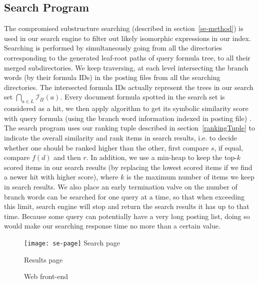 \subsection{Search Program}
\label{se-and-rank}
The compromised substructure searching (described in section~\ref{se-method}) is used in our search engine to filter out likely isomorphic expressions in our index.
Searching is performed by simultaneously going from all the directories corresponding to the generated leaf-root paths of query formula tree,
to all their merged subdirectories. 
We keep traversing, at each level intersecting the branch words (by their formula IDs) in the posting files from all the searching directories. 
The intersected formula IDs actually represent the trees in our search set $\bigcap_{a \in L} \mathcal{I}_{\Pi}(a)$.
Every document formula spotted in the search set is considered as a hit, we then apply  algorithm to get its symbolic similarity score with query formula
(using the branch word information indexed in posting file)
.
The search program uses our ranking tuple described in section~\ref{rankingTuple} to indicate the overall similarity and rank items in search results,
i.e. to decide whether one should be ranked higher than the other, first compare $s$, if equal, compare $f(d)$ and then $r$.
In addition, we use a min-heap to keep the top-$k$ scored items in our search results (by replacing the lowest scored items if we find a newer hit with higher score), where $k$ is the maximum number of items we keep in search results.
We also place an early termination valve on the number of branch words can be searched for one query at a time,
so that when exceeding this limit, search engine will stop and return the search results it has up to that time. Because some query can potentially have a very long posting list, doing so would make our searching response time no more than a certain value.

\begin{figure}
\begin{minipage}[b]{2.65in}
\begin{center}
\texttt{[image: se-page]}
Search page
\end{center}
\end{minipage}
\hspace*{.38in}
\begin{minipage}[b]{2.65in}
\begin{center}
Results page
\end{center}
\end{minipage}
\caption{Web front-end}\label{frontEnd}
\end{figure}

